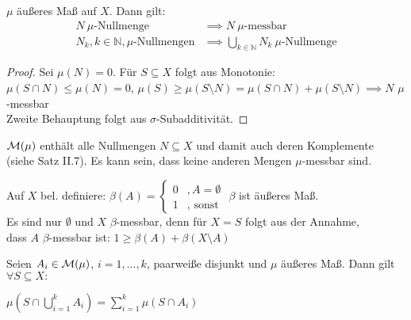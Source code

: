 \documentclass[11pt,a4paper,fleqn,openany]{report}
\begin{document}
    \newpage
    \begin{theorem}
      $\mu$ äußeres Maß auf $X$. Dann gilt:
      \begin{align*}
        N \ \mu\text{-Nullmenge} &\implies N \ \mu\text{-messbar}\\
        N_k, k \in \mathbb{N}, \mu\text{-Nullmengen} &\implies \bigcup\limits_{k \in \mathbb{N}} N_k \ \mu\text{-Nullmenge}
      \end{align*}
    \end{theorem}

    \begin{proof}
      Sei $\mu(N) = 0$. Für $S \subseteq X$ folgt aus Monotonie:\\
      $\mu(S\cap N) \leq \mu(N) = 0$, $\mu(S) \geq \mu(S \setminus N) = \mu(S \cap N) + \mu(S \setminus N) \implies N$ $\mu$-messbar\\
      Zweite Behauptung folgt aus $\sigma$-Subadditivität.
    \end{proof}

    \begin{remark}
      $\mathcal{M}(\mu)$ enthält alle Nullmengen $N \subseteq X$ und damit auch deren Komplemente\\
      (siehe Satz II.7). Es kann sein, dass keine anderen Mengen $\mu$-messbar sind.
    \end{remark}

    \begin{example}
      Auf $X$ bel. definiere: $\beta(A) = \begin{cases}
        0 & , A = \emptyset\\
        1 & , \text{ sonst}
      \end{cases}$
      $\beta$ ist äußeres Maß.\\
      Es sind nur $\emptyset$ und $X$ $\beta$-messbar, denn für $X=S$ folgt aus der Annahme,\\
      dass $A$ $\beta$-messbar ist: $1 \geq \beta(A) + \beta(X \setminus A)$
    \end{example}


    \begin{lemma}
      Seien $A_i \in \mathcal{M}(\mu)$, $i=1,...,k$, paarweiße disjunkt und $\mu$ äußeres Maß. Dann gilt $\forall S \subseteq X:$
      \begin{center}
        $\mu(S \cap \bigcup\limits_{i=1}^k A_i) = \sum\limits_{i=1}^k \mu(S \cap A_i)$
      \end{center}
    \end{lemma}
\end{document}
